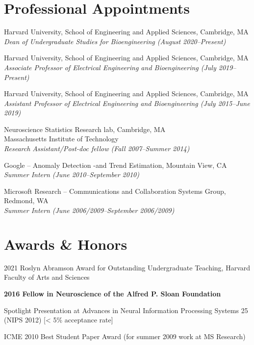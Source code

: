 \documentclass[12pt,letterpaper]{article}
\renewenvironment{itemize}{
  \begin{list}{}{
    \setlength{\leftmargin}{1.5em}
    \setlength{\itemsep}{0.25em}
    \setlength{\parskip}{0pt}
    \setlength{\parsep}{0.25em}
  }
}{
  \end{list}
}
\begin{document}
\section*{Professional Appointments}

\begin{itemize}
    \item Harvard University, School of Engineering and Applied Sciences, Cambridge, MA\\
          \emph{Dean of Undergraduate Studies for Bioengineering (August 2020--Present)}
    \item Harvard University, School of Engineering and Applied Sciences, Cambridge, MA\\
          \emph{Associate Professor of Electrical Engineering and Bioengineering (July 2019--Present)}
          
    \item Harvard University, School of Engineering and Applied Sciences, Cambridge, MA\\
          \emph{Assistant Professor of Electrical Engineering and Bioengineering (July 2015--June 2019)}
          
    \item Neuroscience Statistics Research lab, Cambridge, MA\\
          Massachusetts Institute of Technology \\
          \emph{Research Assistant/Post-doc fellow (Fall 2007--Summer 2014)}

    \item Google -- Anomaly Detection -and Trend Estimation, Mountain View, CA\\
          \emph{Summer Intern (June 2010--September 2010)}

    \item Microsoft Research -- Communications and Collaboration Systems Group, Redmond, WA\\
          \emph{Summer Intern (June 2006/2009--September 2006/2009)}
\end{itemize}

\section*{Awards \& Honors}

\begin{itemize}
	\item 2021 Roslyn Abramson Award for Outstanding Undergraduate Teaching, Harvard Faculty of Arts and Sciences
	\item \textbf{2016 Fellow in Neuroscience of the Alfred P. Sloan Foundation}
    \item Spotlight Presentation at Advances in Neural Information Processing Systems 25 (NIPS 2012) [< 5\% acceptance rate]
    \item ICME 2010 Best Student Paper Award (for summer 2009 work at MS Research)
\end{itemize}
\end{document}
